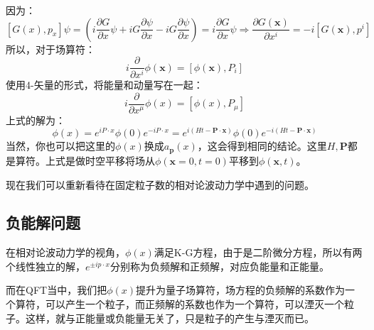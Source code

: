 \documentclass{book}
\begin{document}
因为：
$$
[G(x),p_x]\psi=\left(i\frac{\partial G}{\partial x}\psi+iG\frac{\partial \psi}{\partial x}-iG\frac{\partial \psi}{\partial x}\right)=i\frac{\partial G}{\partial x}\psi\Rightarrow \frac{\partial G(\mathbf{x})}{\partial x^i}=-i[G(\mathbf{x}),p^i]
$$
所以，对于场算符：
$$
i\frac{\partial}{\partial x^i}\phi(\mathbf{x})=[\phi(\mathbf{x}),P_i]
$$
使用4-矢量的形式，将能量和动量写在一起：
$$
i\frac{\partial}{\partial x^\mu}\phi(x)=[\phi(x),P_\mu]
$$
上式的解为：
$$
\phi(x)=e^{iP\cdot x}\phi(0)e^{-iP\cdot x}=e^{i(Ht-\mathbf{P}\cdot\mathbf{x})}\phi(0)e^{-i(Ht-\mathbf{P}\cdot\mathbf{x})}
$$
当然，你也可以把这里的$\phi(x)$换成$a_{\mathbf{p}}(x)$，这会得到相同的结论。这里$H,\mathbf{P}$都是算符。上式是做时空平移将场从$\phi(\mathbf{x}=0,t=0)$平移到$\phi(\mathbf{x},t)$。

现在我们可以重新看待在固定粒子数的相对论波动力学中遇到的问题。
\subsection{负能解问题}
在相对论波动力学的视角，$\phi(x)$满足K-G方程，由于是二阶微分方程，所以有两个线性独立的解，$e^{\pm ip\cdot x}$分别称为负频解和正频解，对应负能量和正能量。

而在QFT当中，我们把$\phi(x)$提升为量子场算符，场方程的负频解的系数作为一个算符，可以产生一个粒子，而正频解的系数也作为一个算符，可以湮灭一个粒子。这样，就与正能量或负能量无关了，只是粒子的产生与湮灭而已。
\end{document}
